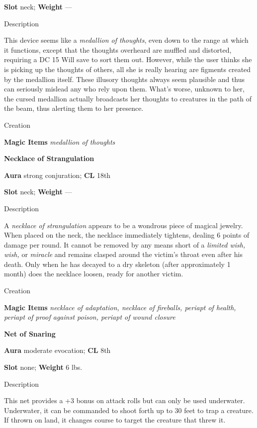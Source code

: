 \textbf{Slot} neck; \textbf{Weight }---
				
Description
				
This device seems like a \textit{medallion of thoughts}, even down to the range at which it functions, except that the thoughts overheard are muffled and distorted, requiring a DC 15 Will save to sort them out. However, while the user thinks she is picking up the thoughts of others, all she is really hearing are figments created by the medallion itself. These illusory thoughts always seem plausible and thus can seriously mislead any who rely upon them. What's worse, unknown to her, the cursed medallion actually broadcasts her thoughts to creatures in the path of the beam, thus alerting them to her presence. 
				
Creation
				
\textbf{Magic Items}\textit{ medallion of thoughts}
				
\textbf{Necklace of Strangulation}
				
\textbf{Aura} strong conjuration; \textbf{CL} 18th
				
\textbf{Slot} neck; \textbf{Weight }---
				
Description
				
A \textit{necklace of strangulation }appears to be a wondrous piece of magical jewelry. When placed on the neck, the necklace immediately tightens, dealing 6 points of damage per round. It cannot be removed by any means short of a \textit{limited wish, wish, }or \textit{miracle }and remains clasped around the victim's throat even after his death. Only when he has decayed to a dry skeleton (after approximately 1 month) does the necklace loosen, ready for another victim. 
				
Creation
				
\textbf{Magic Items}\textit{ necklace of adaptation, necklace of fireballs, periapt of health, periapt of proof against poison, periapt of wound closure}
				
\textbf{Net of Snaring}
				
\textbf{Aura} moderate evocation; \textbf{CL} 8th
				
\textbf{Slot} none; \textbf{Weight }6 lbs.
				
Description
				
This net provides a +3 bonus on attack rolls but can only be used underwater. Underwater, it can be commanded to shoot forth up to 30 feet to trap a creature. If thrown on land, it changes course to target the creature that threw it.
				
